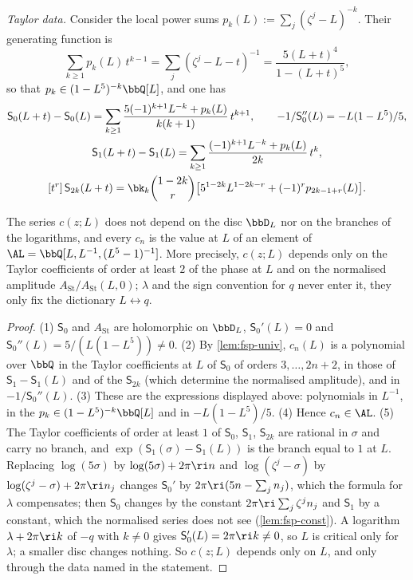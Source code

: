 \emph{Taylor data.} Consider the local power sums $p_k(L):=\sum_j(\zeta^j-L)^{-k}$. Their generating function is
\[
\sum_{k\geq1}p_k(L)\,t^{k-1}=\sum_j(\zeta^j-L-t)^{-1}=\frac{5(L+t)^4}{1-(L+t)^5},
\]
so that $p_k\in(1-L^5)^{-k}\bbQ[L]$, and one has
\begin{gather*}
\mathsf S_0(L+t)-\mathsf S_0(L)=\sum_{k\geq1}\frac{5(-1)^{k+1}L^{-k}+p_k(L)}{k(k+1)}\,t^{k+1},\qquad
-1/\mathsf S_0''(L)=-L(1-L^5)/5,\\
\mathsf S_1(L+t)-\mathsf S_1(L)=\sum_{k\geq1}\frac{(-1)^{k+1}L^{-k}+p_k(L)}{2k}\,t^{k},\\
[t^r]\,\mathsf S_{2k}(L+t)=\bk_k\binom{1-2k}{r}\bigl[5^{1-2k}L^{1-2k-r}+(-1)^rp_{2k-1+r}(L)\bigr].
\end{gather*}

\begin{prop}[Rationality]
\label{prop:gam-rational}
The series $c(z;L)$ does not depend on the disc $\bbD_L$ nor on the branches of the logarithms, and every $c_n$ is the value at $L$ of an element of $\AL=\bbQ[L,L^{-1},(L^5-1)^{-1}]$. More precisely, $c(z;L)$ depends only on the Taylor coefficients of order at least $2$ of the phase at $L$ and on the normalised amplitude $A_{\mathrm{St}}/A_{\mathrm{St}}(L,0)$; $\lambda$ and the sign convention for $q$ never enter it, they only fix the dictionary $L\leftrightarrow q$.
\end{prop}

\begin{proof}
(1) $\mathsf S_0$ and $A_{\mathrm{St}}$ are holomorphic on $\bbD_L$, $\mathsf S_0'(L)=0$ and $\mathsf S_0''(L)=5/(L(1-L^5))\neq0$. (2) By \cref{lem:fsp-univ}, $c_n(L)$ is a polynomial over $\bbQ$ in the Taylor coefficients at $L$ of $\mathsf S_0$ of orders $3,\dots,2n+2$, in those of $\mathsf S_1-\mathsf S_1(L)$ and of the $\mathsf S_{2k}$ (which determine the normalised amplitude), and in $-1/\mathsf S_0''(L)$. (3) These are the expressions displayed above: polynomials in $L^{-1}$, in the $p_k\in(1-L^5)^{-k}\bbQ[L]$ and in $-L(1-L^5)/5$. (4) Hence $c_n\in\AL$. (5) The Taylor coefficients of order at least $1$ of $\mathsf S_0$, $\mathsf S_1$, $\mathsf S_{2k}$ are rational in $\sigma$ and carry no branch, and $\exp(\mathsf S_1(\sigma)-\mathsf S_1(L))$ is the branch equal to $1$ at $L$. Replacing $\log(5\sigma)$ by $\log(5\sigma)+2\pi\ri n$ and $\log(\zeta^j-\sigma)$ by $\log(\zeta^j-\sigma)+2\pi\ri n_j$ changes $\mathsf S_0'$ by $2\pi\ri(5n-\sum_jn_j)$, which the formula for $\lambda$ compensates; then $\mathsf S_0$ changes by the constant $2\pi\ri\sum_j\zeta^jn_j$ and $\mathsf S_1$ by a constant, which the normalised series does not see (\cref{lem:fsp-const}). A logarithm $\lambda+2\pi\ri k$ of $-q$ with $k\neq0$ gives $\mathsf S_0'(L)=2\pi\ri k\neq0$, so $L$ is critical only for $\lambda$; a smaller disc changes nothing. So $c(z;L)$ depends only on $L$, and only through the data named in the statement.
\end{proof}

